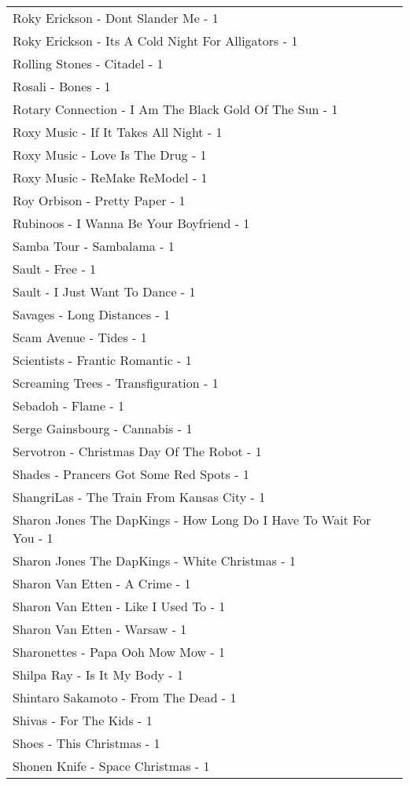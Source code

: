 \documentclass[
]{article}
\begin{document}
\begin{longtable}{l}
Roky Erickson - Dont Slander Me - 1 \\ 
Roky Erickson - Its A Cold Night For Alligators - 1 \\ 
Rolling Stones - Citadel - 1 \\ 
Rosali - Bones - 1 \\ 
Rotary Connection - I Am The Black Gold Of The Sun - 1 \\ 
Roxy Music - If It Takes All Night - 1 \\ 
Roxy Music - Love Is The Drug - 1 \\ 
Roxy Music - ReMake ReModel - 1 \\ 
Roy Orbison - Pretty Paper - 1 \\ 
Rubinoos - I Wanna Be Your Boyfriend - 1 \\ 
Samba Tour - Sambalama - 1 \\ 
Sault - Free - 1 \\ 
Sault - I Just Want To Dance - 1 \\ 
Savages - Long Distances - 1 \\ 
Scam Avenue - Tides - 1 \\ 
Scientists - Frantic Romantic - 1 \\ 
Screaming Trees - Transfiguration - 1 \\ 
Sebadoh - Flame - 1 \\ 
Serge Gainsbourg - Cannabis - 1 \\ 
Servotron - Christmas Day Of The Robot - 1 \\ 
Shades - Prancers Got Some Red Spots - 1 \\ 
ShangriLas - The Train From Kansas City - 1 \\ 
Sharon Jones The DapKings - How Long Do I Have To Wait For You - 1 \\ 
Sharon Jones The DapKings - White Christmas - 1 \\ 
Sharon Van Etten - A Crime - 1 \\ 
Sharon Van Etten - Like I Used To - 1 \\ 
Sharon Van Etten - Warsaw - 1 \\ 
Sharonettes - Papa Ooh Mow Mow - 1 \\ 
Shilpa Ray - Is It My Body - 1 \\ 
Shintaro Sakamoto - From The Dead - 1 \\ 
Shivas - For The Kids - 1 \\ 
Shoes - This Christmas - 1 \\ 
Shonen Knife - Space Christmas - 1 \\ 

\end{longtable}
\end{document}
